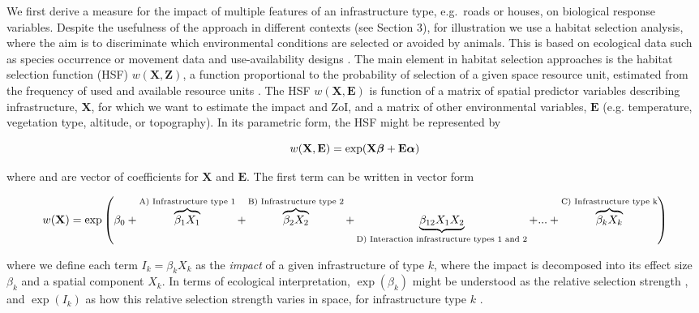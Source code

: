 \documentclass[titlepage]{article}
\begin{document}
We first derive a measure for the impact of multiple features of an infrastructure type, e.g.\ roads or houses, on biological response variables. Despite the usefulness of the approach in different contexts (see Section 3), for illustration we use a habitat selection analysis, where the aim is to discriminate which environmental conditions are selected or avoided by animals. This is based on ecological data such as species occurrence or movement data and use-availability designs \citep{fieberg_how_2021}. The main element in habitat selection approaches is the habitat selection function (HSF) $w(\textbf{X},\textbf{Z})$, a function proportional to the probability of selection of a given space resource unit, estimated from the frequency of used and available resource units \citep{thurfjell_applications_2014}. The HSF $w(\textbf{X},\textbf{E})$ is function of a matrix of spatial predictor variables describing infrastructure, $\textbf{X}$, for which we want to estimate the impact and ZoI, and a matrix of other environmental variables, $\textbf{E}$ (e.g. temperature, vegetation type, altitude, or topography). In its parametric form, the HSF might be represented by

\begin{equation}
\centering
\label{eqn:HSFgeneral}
    w(\textbf{X},\textbf{E}) = \exp (\textbf{X} \bm{\beta} + \textbf{E} \bm{\alpha})
\end{equation}

where \bm{$\beta$} and \bm{$\alpha$} are vector of coefficients for $\textbf{X}$ and $\textbf{E}$. The first term can be written in vector form

\begin{equation}
\centering
\label{eqn:HSF}
    w(\textbf{X}) = \exp \left( \beta_0 + \overbrace{\beta_1 X_1}^\text{A) Infrastructure type 1} + \overbrace{\beta_2 X_2}^\text{B) Infrastructure type 2} + \underbrace{\beta_{12} X_1 X_2}_\text{D) Interaction infrastructure types 1 and 2} + ... + \overbrace{\beta_k X_k}^\text{C) Infrastructure type k} \right)
\end{equation}

where we define each term $I_k = \beta_k X_k$ as the \textit{impact} of a given infrastructure of type $k$, where the impact is decomposed into its effect size $\beta_k$ and a spatial component $X_k$. In terms of ecological interpretation, $\exp(\beta_k)$ might be understood as the relative selection strength \citep{avgar_relative_2017}, and $\exp(I_k)$ as how this relative selection strength varies in space, for infrastructure type $k$ \citep{fieberg_how_2021}.
\end{document}
